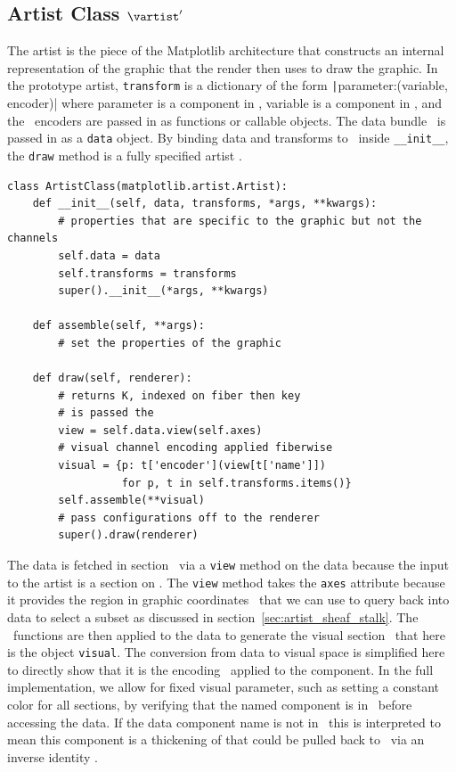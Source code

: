 \documentclass[../main.tex]{subfiles}
\begin{document}
\subsection{Artist Class $\vartist^{\prime}$}
\label{sec:code_artist}
The artist is the piece of the Matplotlib architecture that constructs an internal representation of the graphic that the render then uses to draw the graphic. In the prototype artist, \texttt{transform} is a dictionary of the form \texttt|{parameter:(variable, encoder)}| where parameter is a component in \vfiber, variable is a component in \dfiber,  and the \vchannel\ encoders are passed in as functions or callable objects. The data bundle \dtotal\ is passed in as a \texttt{data} object. By binding data and transforms to \vartisteq\ inside \texttt{__init__}, the \texttt{draw} method is a fully specified artist \vartist.

\begin{verbatim}
class ArtistClass(matplotlib.artist.Artist):
    def __init__(self, data, transforms, *args, **kwargs):
        # properties that are specific to the graphic but not the channels
        self.data = data 
        self.transforms = transforms
        super().__init__(*args, **kwargs)

    def assemble(self, **args):
        # set the properties of the graphic

    def draw(self, renderer):
        # returns K, indexed on fiber then key 
        # is passed the 
        view = self.data.view(self.axes) 
        # visual channel encoding applied fiberwise 
        visual = {p: t['encoder'](view[t['name']])
                  for p, t in self.transforms.items()}
        self.assemble(**visual)
        # pass configurations off to the renderer
        super().draw(renderer)
\end{verbatim}

The data is fetched in section \dsection\ via a \texttt{view} method on the data because the input to the artist is a section on \dtotal. The \texttt{view} method takes the \texttt{axes} attribute because it provides the region in graphic coordinates \gbase\ that we can use to query back into data to select a subset as discussed in section~\ref{sec:artist_sheaf_stalk}. The \vchannel\ functions are then applied to the data to generate the visual section \vsection\ that here is the object \texttt{visual}. The conversion from data to visual space is simplified here to directly show that it is the encoding \vchannel\ applied to the component. In the full implementation, we allow for fixed visual parameter, such as setting a constant color for all sections, by verifying that the named component is in \dfiber\ before accessing the data. If the data component name is not in \dfiber\, this is interpreted to mean this component is a thickening of \vtotal that could be pulled back to \dtotal\ via an inverse identity \vchannel. 
\end{document}
